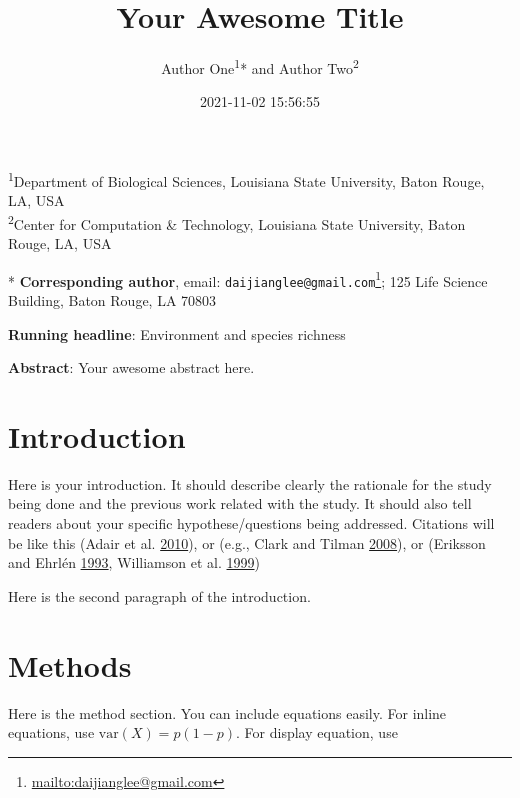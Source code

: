 \documentclass[
  12pt,
]{article}
\title{Your Awesome Title}
\author{Author One\textsuperscript{1}* and Author Two\textsuperscript{2}}
\date{2021-11-02 15:56:55}
\DeclareRobustCommand{\href}[2]{#2\footnote{\url{#1}}}
\begin{document}
\maketitle

\renewcommand{\figurename}{{\textbf{Figure}}}
\renewcommand{\tablename}{{\textbf{Table}}}

\footnotesize

\textsuperscript{1}Department of Biological Sciences, Louisiana State University, Baton Rouge, LA, USA\\
\textsuperscript{2}Center for Computation \& Technology, Louisiana State University, Baton Rouge, LA, USA

* \textbf{Corresponding author}, email: \href{mailto:daijianglee@gmail.com}{\nolinkurl{daijianglee@gmail.com}}; 125 Life Science Building, Baton Rouge, LA 70803

\normalsize

\textbf{Running headline}: Environment and species richness

\textbf{Abstract}: Your awesome abstract here.

\clearpage

\hypertarget{introduction}{%
\section{Introduction}\label{introduction}}

Here is your introduction. It should describe clearly the rationale for the study being done and the previous work related with the study. It should also tell readers about your specific hypothese/questions being addressed. Citations will be like this (Adair et al. \protect\hyperlink{ref-adair_single-pool_2010}{2010}), or (e.g., Clark and Tilman \protect\hyperlink{ref-clark_loss_2008}{2008}), or (Eriksson and Ehrlén \protect\hyperlink{ref-eriksson_seed_1993}{1993}, Williamson et al. \protect\hyperlink{ref-williamson_dissolved_1999}{1999})

Here is the second paragraph of the introduction.

\hypertarget{methods}{%
\section{Methods}\label{methods}}

Here is the method section. You can include equations easily. For inline equations, use \(\text{var}(X) = p(1-p)\). For display equation, use
\end{document}
